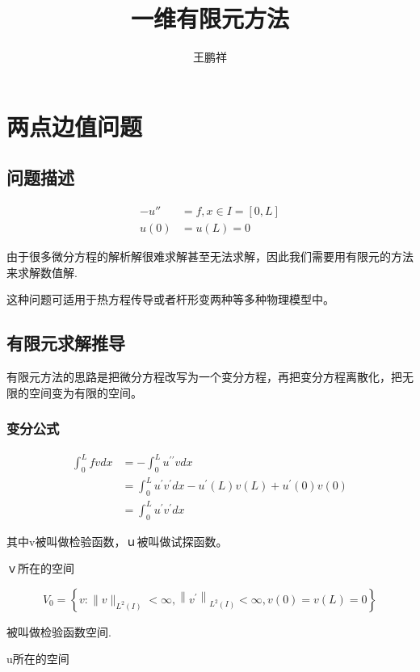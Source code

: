 \documentclass{article}
\begin{document}
\title{一维有限元方法}
\author{王鹏祥}
\date{\chntoday}
\maketitle
\tableofcontents
\newpage
\section{两点边值问题}
\subsection{问题描述}
\begin{align}
	-u'' & = f, x \in I = [0, L] \\
       u(0) & = u(L) = 0
\end{align}

由于很多微分方程的解析解很难求解甚至无法求解，因此我们需要用有限元的方法来求解数值解.

这种问题可适用于热方程传导或者杆形变两种等多种物理模型中。

\subsection{有限元求解推导}
有限元方法的思路是把微分方程改写为一个变分方程，再把变分方程离散化，把无限的空间变为有限的空间。
\subsubsection{变分公式}

\begin{equation}
\begin{aligned}
\int_{0}^{L} f v d x &=-\int_{0}^{L} u^{\prime \prime} v d x \\
&=\int_{0}^{L} u^{\prime} v^{\prime} d x-u^{\prime}(L) v(L)+u^{\prime}(0) v(0) \\
&=\int_{0}^{L} u^{\prime} v^{\prime} d x
\end{aligned}
\end{equation}

其中v被叫做检验函数，ｕ被叫做试探函数。

ｖ所在的空间

\begin{equation*}
V_{0}=\left\{v:\|v\|_{L^{2}(I)}<\infty,\left\|v^{\prime}\right\|_{L^{2}(I)}<\infty, v(0)=v(L)=0\right\}
\end{equation*}

被叫做检验函数空间.

u所在的空间
\end{document}
